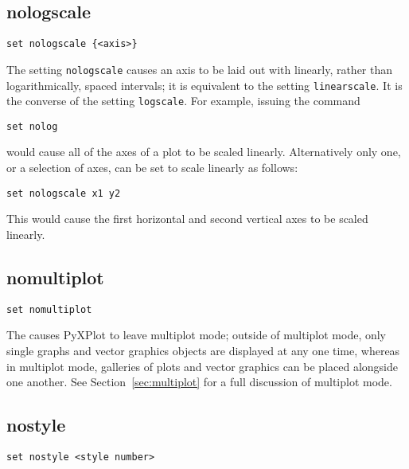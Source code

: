 \subsection{nologscale}

\begin{verbatim}
set nologscale {<axis>}
\end{verbatim}

The setting {\tt nologscale} causes an axis to be laid out with linearly,
rather than logarithmically, spaced intervals; it is equivalent to the setting
{\tt linearscale}. It is the converse of the setting {\tt logscale}.  For
example, issuing the command

\begin{verbatim}
set nolog
\end{verbatim}

\noindent would cause all of the axes of a plot to be scaled linearly.
Alternatively only one, or a selection of axes, can be set to scale linearly as
follows:

\begin{verbatim}
set nologscale x1 y2
\end{verbatim}

\noindent This would cause the first horizontal and second vertical axes to be
scaled linearly.


\subsection{nomultiplot}

\begin{verbatim}
set nomultiplot
\end{verbatim}

The  causes PyXPlot to leave multiplot mode; outside
of multiplot mode, only single graphs and vector graphics objects are displayed
at any one time, whereas in multiplot mode, galleries of plots and vector
graphics can be placed alongside one another.  See Section~\ref{sec:multiplot}
for a full discussion of multiplot mode.


\subsection{nostyle}

\begin{verbatim}
set nostyle <style number>
\end{verbatim}

